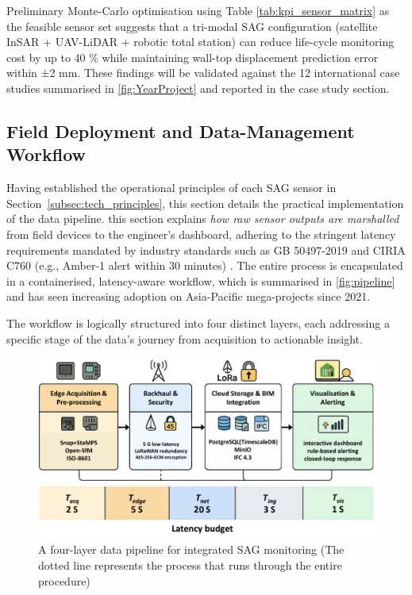 \documentclass[preprint,11pt,authoryear,3p]{elsarticle}
\begin{document}
Preliminary Monte-Carlo optimisation using Table \ref{tab:kpi_sensor_matrix} as the feasible sensor set suggests that a tri-modal SAG configuration (satellite InSAR + UAV-LiDAR + robotic total station) can reduce life-cycle monitoring cost by up to 40 \% while maintaining wall-top displacement prediction error within ±2 mm. These findings will be validated against the 12 international case studies summarised in \autoref{fig:YearProject} and reported in the case study section.

\subsection{Field Deployment and Data-Management Workflow}
\label{subsec:workflow}

Having established the operational principles of each SAG sensor in Section~\ref{subsec:tech_principles}, this section details the practical implementation of the data pipeline. this section explains \emph{how raw sensor outputs are marshalled} from field devices to the engineer's dashboard, adhering to the stringent latency requirements mandated by industry standards such as GB 50497-2019 and CIRIA C760 (e.g., Amber-1 alert within 30 minutes) \citep{GB50497:2019,CIRIA760}. The entire process is encapsulated in a containerised, latency-aware workflow, which is summarised in \autoref{fig:pipeline} and has seen increasing adoption on Asia-Pacific mega-projects since 2021.

The workflow is logically structured into four distinct layers, each addressing a specific stage of the data's journey from acquisition to actionable insight.

\begin{figure}[htbp]
  \centering
  \includegraphics[width=\linewidth]{imgs/Twin_Workflow.pdf}
  \caption{A four-layer data pipeline for integrated SAG monitoring (The dotted line represents the process that runs through the entire procedure)}
  \label{fig:pipeline}
\end{figure}
\end{document}
